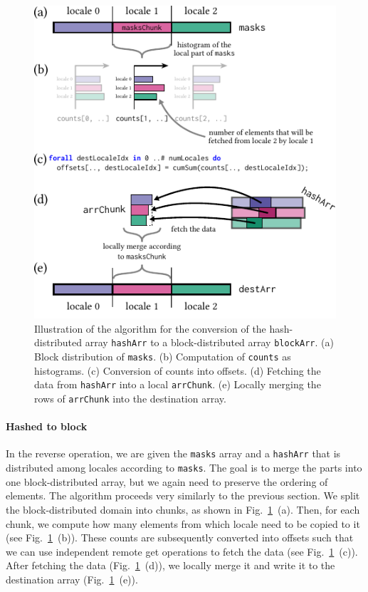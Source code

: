 \begin{figure}[h]
    \centering
    \includegraphics[width=0.7\linewidth]{./chapters/Proceedings_PAW_ATM_2023/algo-arrFromHashedToBlock.pdf}
    \cprotect\caption{Illustration of the algorithm for the conversion of the hash-distributed array \verb|hashArr| to a block-distributed array \verb|blockArr|.
    (a) Block distribution of \verb|masks|.
    (b) Computation of \verb|counts| as histograms.
    (c) Conversion of counts into offsets.
    (d) Fetching the data from \verb|hashArr| into a local \verb|arrChunk|.
    (e) Locally merging the rows of \verb|arrChunk| into the destination array.}
    \label{fig:ls23:algo:arrFromHashedToBlock}
\end{figure}


\paragraph{Hashed to block}

In the reverse operation, we are given the \verb|masks| array and a \verb|hashArr| that is distributed among locales according to \verb|masks|. The goal is to merge the parts into one block-distributed array, but we again need to preserve the ordering of elements. The algorithm proceeds very similarly to the previous section. We split the block-distributed domain into chunks, as shown in Fig.~\ref{fig:ls23:algo:arrFromHashedToBlock}~(a). Then, for each chunk, we compute how many elements from which locale need to be copied to it (see Fig.~\ref{fig:ls23:algo:arrFromHashedToBlock}~(b)). These counts are subsequently converted into offsets such that we can use independent remote get operations to fetch the data (see Fig.~\ref{fig:ls23:algo:arrFromHashedToBlock}~(c)). After fetching the data (Fig.~\ref{fig:ls23:algo:arrFromHashedToBlock}~(d)), we locally merge it and write it to the destination array (Fig.~\ref{fig:ls23:algo:arrFromHashedToBlock}~(e)).

